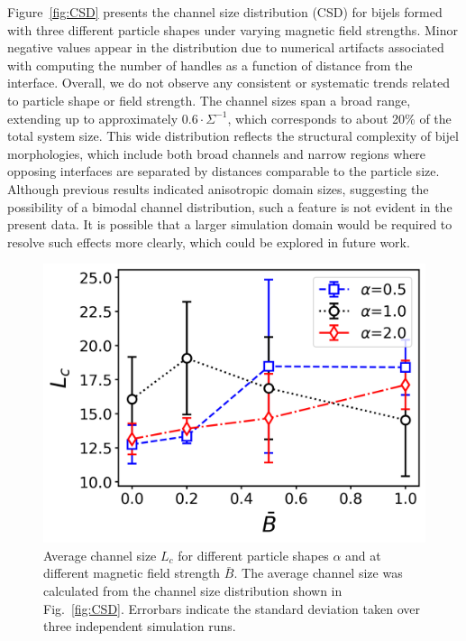 Figure~\ref{fig:CSD} presents the channel size distribution (CSD) for bijels formed with three different particle shapes under varying magnetic field strengths. Minor negative values appear in 
the distribution due to numerical artifacts associated with computing the number of handles as a function of distance from the interface. Overall, we do not observe any consistent or systematic 
trends related to particle shape or field strength. The channel sizes span a broad range, extending up to approximately \(0.6 \cdot \Sigma^{-1}\), which corresponds to about 20\% of the total system 
size. This wide distribution reflects the structural complexity of bijel morphologies, which include both broad channels and narrow regions where opposing interfaces are separated by distances 
comparable to the particle size. Although previous results indicated anisotropic domain sizes, suggesting the possibility of a bimodal channel distribution, such a feature is not evident in the 
present data. It is possible that a larger simulation domain would be required to resolve such effects more clearly, which could be explored in future work.

\begin{figure}
\centering
\includegraphics[scale = 0.6]{../figures/results/paper1_5/channel_size_field.png}%
\caption{Average channel size $L_c$ for different particle shapes $\alpha$ and at different magnetic field strength $\bar{B}$. The average channel size was calculated from the channel size distribution shown in Fig.~\ref{fig:CSD}. Errorbars indicate the standard deviation taken over three independent simulation runs.
\label{fig:channel_size_field}}%
\end{figure}

